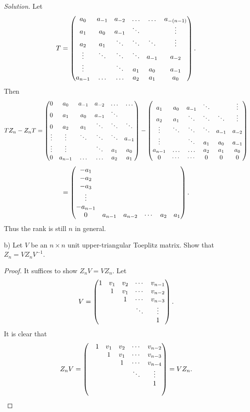 \documentclass[12pt]{article}
\theoremstyle{plain}
\begin{document}
{\it Solution.} 
Let
$$T = \begin{pmatrix}
a_{0} & a_{-1} & a_{-2} & \ldots & \ldots  &a_{-(n-1)}  \\
  a_{1} & a_0  & a_{-1} &  \ddots   &  &  \vdots \\
  a_{2}    & a_{1} & \ddots  & \ddots & \ddots& \vdots \\ 
 \vdots &  \ddots & \ddots &   \ddots  & a_{-1} & a_{-2}\\
 \vdots &         & \ddots & a_{1} & a_{0}&  a_{-1} \\
a_{n-1} &  \ldots & \ldots & a_{2} & a_{1} & a_{0}
\end{pmatrix}.$$
Then
$$TZ_n - Z_nT = \begin{pmatrix}
0&a_{0} & a_{-1} & a_{-2} & \ldots & \ldots    \\
0&  a_{1} & a_0  & a_{-1} &  \ddots   &   \\
0&  a_{2}    & a_{1} & \ddots  & \ddots & \ddots \\ 
\vdots& \vdots &  \ddots & \ddots &   \ddots  & a_{-1} \\
\vdots& \vdots &         & \ddots & a_{1} & a_{0} \\
0&a_{n-1} &  \ldots & \ldots & a_{2} & a_{1} \\
\end{pmatrix}-\begin{pmatrix}
  a_{1} & a_0  & a_{-1} &  \ddots   &  &  \vdots \\
  a_{2}    & a_{1} & \ddots  & \ddots & \ddots& \vdots \\ 
 \vdots &  \ddots & \ddots &   \ddots  & a_{-1} & a_{-2}\\
 \vdots &         & \ddots & a_{1} & a_{0}&  a_{-1} \\
a_{n-1} &  \ldots & \ldots & a_{2} & a_{1} & a_{0} \\
0 & \cdots & \cdots & 0 & 0 & 0 \\
\end{pmatrix}$$
$$=\begin{pmatrix}
-a_1  & & & & \\
-a_2 & & & & \\
-a_3 & & & & \\
\vdots & & & & \\
-a_{n-1} & & & & \\
0 & a_{n-1} & a_{n-2} & \cdots & a_2 & a_1 \\
\end{pmatrix}.$$
Thus the rank is still $n$ in general.

b) Let $V$ be an $n\times n$ unit upper-triangular Toeplitz matrix. Show that $Z_n = VZ_n V^{-1}$.

\begin{proof}
It suffices to show $Z_nV = VZ_n$. Let
$$V = \begin{pmatrix}
1& v_1 & v_2 & \cdots & v_{n-1} \\
 & 1 & v_1 & \cdots & v_{n-2} \\
 &  & 1 & \cdots & v_{n-3} \\
 &  &  & \ddots & \vdots \\
 &  &  &  & 1 \\
\end{pmatrix}.$$
It is clear that
$$Z_nV = \begin{pmatrix}
&1& v_1 & v_2 & \cdots & v_{n-2} \\
& & 1 & v_1 & \cdots & v_{n-3} \\
& &  & 1 & \cdots & v_{n-4} \\
& &  &  & \ddots & \vdots \\
& &  &  &  & 1 \\
& &  &  &  & \\
\end{pmatrix} =VZ_n.$$
\end{proof}
\end{document}
